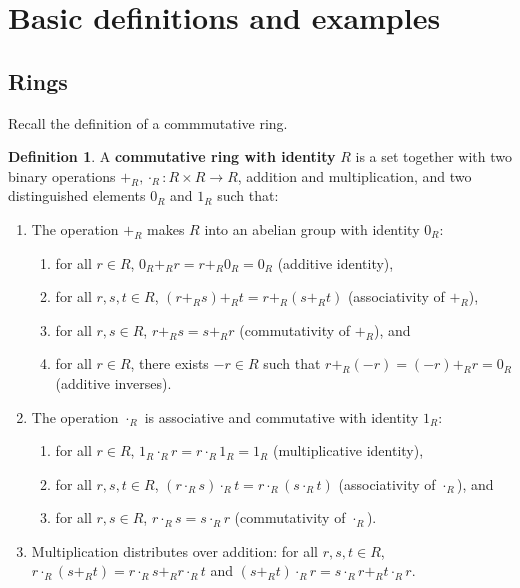 \documentclass{article}
\newcommand{\rb}[1]{\left( #1 \right)}
\theoremstyle{definition}\newtheorem{definition}{Definition}[section]
\theoremstyle{definition}\newtheorem{remark}[definition]{Remark}
\theoremstyle{definition}\newtheorem*{example}{Example}
\theoremstyle{definition}\newtheorem*{note}{Note}
\begin{document}
\section{Basic definitions and examples}

\subsection{Rings}

Recall the definition of a commmutative ring.

\begin{definition}
A \textbf{commutative ring with identity} $ R $ is a set together with two binary operations $ +_R, \cdot_R : R \times R \to R $, addition and multiplication, and two distinguished elements $ 0_R $ and $ 1_R $ such that:
\begin{enumerate}
\item The operation $ +_R $ makes $ R $ into an abelian group with identity $ 0_R $:
\begin{enumerate}
\item for all $ r \in R $, $ 0_R +_R r = r +_R 0_R = 0_R $ (additive identity),
\item for all $ r, s, t \in R $, $ \rb{r +_R s} +_R t = r +_R \rb{s +_R t} $  (associativity of $ +_R $),
\item for all $ r, s \in R $, $ r +_R s = s +_R r $ (commutativity of $ +_R $), and
\item for all $ r \in R $, there exists $ -r \in R $ such that $ r +_R \rb{-r} = \rb{-r} +_R r = 0_R $ (additive inverses).
\end{enumerate}
\item The operation $ \cdot_R $ is associative and commutative with identity $ 1_R $:
\begin{enumerate}
\item for all $ r \in R $, $ 1_R \cdot_R r = r \cdot_R 1_R = 1_R $ (multiplicative identity),
\item for all $ r, s, t \in R $, $ \rb{r \cdot_R s} \cdot_R t = r \cdot_R \rb{s \cdot_R t} $ (associativity of $ \cdot_R $), and
\item for all $ r, s \in R $, $ r \cdot_R s = s \cdot_R r $ (commutativity of $ \cdot_R $).
\end{enumerate}
\item Multiplication distributes over addition: for all $ r, s, t \in R $, $ r \cdot_R \rb{s +_R t} = r \cdot_R s +_R r \cdot_R t $ and $ \rb{s +_R t} \cdot_R r = s \cdot_R r +_R t \cdot_R r $.
\end{enumerate}
\end{definition}
\end{document}
